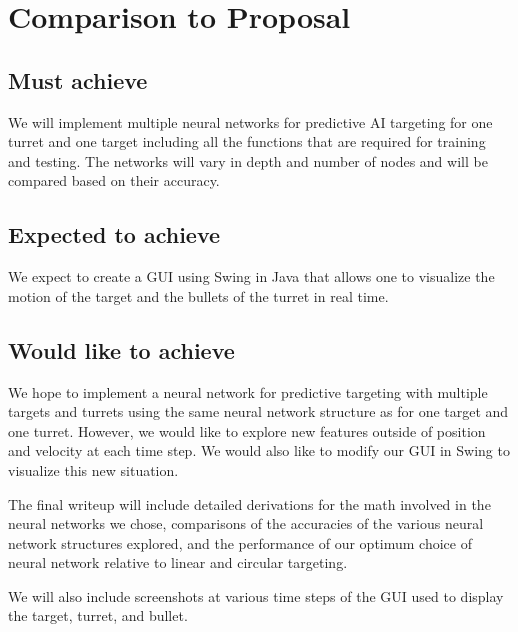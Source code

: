 \documentclass[11pt,letterpaper]{article}
\begin{document}
\section{Comparison to Proposal}
\subsection{Must achieve}

We will implement multiple neural networks for predictive AI targeting for one turret and one target including all the functions that are required for training and testing. The networks will vary in depth and number of nodes and will be compared based on their accuracy.

\subsection{Expected to achieve}

We expect to create a GUI using Swing in Java that allows one to visualize the motion of the target and the bullets of the turret in real time.

\subsection{Would like to achieve}

We hope to implement a neural network for predictive targeting with multiple targets and turrets using the same neural network structure as for one target and one turret. However, we would like to explore new features outside of position and velocity at each time step. We would also like to modify our GUI in Swing to visualize this new situation.

The final writeup will include detailed derivations for the math involved in the neural networks we chose, comparisons of the accuracies of the various neural network structures explored, and the performance of our optimum choice of neural network relative to linear and circular targeting.

We will also include screenshots at various time steps of the GUI used to display the target, turret, and bullet.



\end{document}
